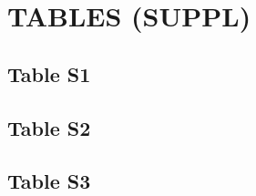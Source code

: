 \documentclass[
]{article}
\begin{document}
\hypertarget{tables-suppl}{%
\section{TABLES (SUPPL)}\label{tables-suppl}}

\hypertarget{table-s1}{%
\subsection{Table S1}\label{table-s1}}

\hypertarget{table-s2}{%
\subsection{Table S2}\label{table-s2}}

\hypertarget{table-s3}{%
\subsection{Table S3}\label{table-s3}}
\end{document}
